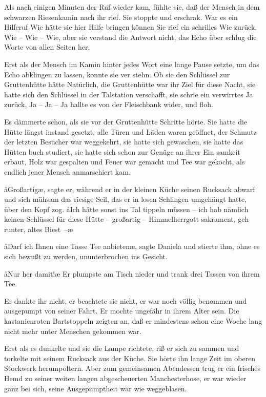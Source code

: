 Als nach einigen Minuten der Ruf wieder kam, fühlte sie, daß
der Mensch in dem schwarzen Riesenkamin nach ihr rief. Sie
stoppte und erschrak. War es ein Hilferuf\frag{} Wie hätte sie hier
Hilfe bringen können\frag{} Sie rief ein schrilles Wie zurück, Wie --
Wie -- Wie, aber sie verstand die Antwort nicht, das Echo über\-%
schlug die Worte von allen Seiten her.

Erst als der Mensch im Kamin hinter jedes Wort eine lange
Pause setzte, um das Echo abklingen zu lassen, konnte sie ver\-%
stehn. Ob sie den Schlüssel zur Gruttenhütte hätte\frag{} Natürlich,
die Gruttenhütte war ihr Ziel für diese Nacht, sie hatte sich den
Schlüssel in der Talstation verschafft, sie schrie ein verwirrtes Ja
zurück, Ja -- Ja -- Ja hallte es von der Fleischbank wider,
und floh.

Es dämmerte schon, als sie vor der Gruttenhütte Schritte
hörte. Sie hatte die Hütte längst instand gesetzt, alle Türen
und Läden waren geöffnet, der Schmutz der letzten Besucher
war weggekehrt, sie hatte sich gewaschen, sie hatte das Hütten\-%
buch studiert, sie hatte sich schon zur Genüge an ihrer Ein\-%
samkeit erbaut, Holz war gespalten und Feuer war gemacht
und Tee war gekocht, als endlich jener Mensch anmarschiert
kam.

\aa{}Großartig\ae{}, sagte er, während er in der kleinen Küche seinen
Rucksack abwarf und sich mühsam das riesige Seil, das er in
losen Schlingen umgehängt hatte, über den Kopf zog. \aa{}Ich
hätte sonst ins Tal tippeln müssen -- ich hab nämlich keinen
Schlüssel für diese Hütte -- großartig -- Himmelherrgott\-%
sakrament, geh runter, altes Biest~--\ae{}

\aa{}Darf ich Ihnen eine Tasse Tee anbieten\ae{}, sagte Daniela und
stierte ihm, ohne es sich bewußt zu werden, ununterbrochen
ins Gesicht.

\aa{}Nur her damit!\ae{} Er plumpste am Tisch nieder und trank drei
Tassen von ihrem Tee.

Er dankte ihr nicht, er beachtete sie nicht, er war noch völlig
benommen und ausgepumpt von seiner Fahrt. Er mochte
ungefähr in ihrem Alter sein. Die kastanienroten Bartstoppeln
zeigten an, daß er mindestens schon eine Woche lang nicht
mehr unter Menschen gekommen war.

Erst als es dunkelte und sie die Lampe richtete, riß er sich zu\-%
sammen und torkelte mit seinem Rucksack aus der Küche. Sie
hörte ihn lange Zeit im oberen Stockwerk herumpoltern.
Aber zum gemeinsamen Abendessen trug er ein frisches Hemd
zu seiner weiten langen abgescheuerten Manchesterhose, er
war wieder ganz bei sich, seine Ausgepumptheit war wie
weggeblasen.

